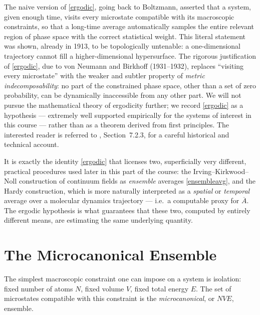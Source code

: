 \begin{remark}
	The naive version of \eqref{ergodic}, going back to Boltzmann, asserted that a system, given enough time, visits every microstate compatible with its macroscopic constraints, so that a long-time average automatically samples the entire relevant region of phase space with the correct statistical weight. This literal statement was shown, already in 1913, to be topologically untenable: a one-dimensional trajectory cannot fill a higher-dimensional hypersurface. The rigorous justification of \eqref{ergodic}, due to von Neumann and Birkhoff (1931--1932), replaces ``visiting every microstate'' with the weaker and subtler property of \textit{metric indecomposability}: no part of the constrained phase space, other than a set of zero probability, can be dynamically inaccessible from any other part. We will not pursue the mathematical theory of ergodicity further; we record \eqref{ergodic} as a hypothesis --- extremely well supported empirically for the systems of interest in this course --- rather than as a theorem derived from first principles. The interested reader is referred to \cite{TadmorMiller}, Section~7.2.3, for a careful historical and technical account.
\end{remark}

\begin{remark}
	It is exactly the identity \eqref{ergodic} that licenses two, superficially very different, practical procedures used later in this part of the course: the Irving--Kirkwood--Noll construction of continuum fields as \textit{ensemble} averages \eqref{ensembleavg}, and the Hardy construction, which is more naturally interpreted as a \textit{spatial} or \textit{temporal} average over a molecular dynamics trajectory --- i.e.\ a computable proxy for $\overline{A}$. The ergodic hypothesis is what guarantees that these two, computed by entirely different means, are estimating the same underlying quantity.
\end{remark}

\section{The Microcanonical Ensemble}

The simplest macroscopic constraint one can impose on a system is isolation: fixed number of atoms $N$, fixed volume $V$, fixed total energy $E$. The set of microstates compatible with this constraint is the \textit{microcanonical}, or $NVE$, ensemble.


